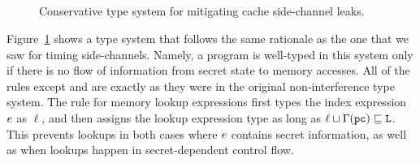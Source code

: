\documentclass[11pt,twoside]{scrartcl}
\begin{document}
\begin{figure}
\begin{calculus}
{\linferenceRule[sequent] {
  \lsequent{\Gamma}{\asprg}
  &\lsequent{\Gamma}{\bsprg}
}{
  \lsequent{\Gamma}{\asprg;\bsprg}
}}{}%
\end{calculus}
\\[1em]
\begin{calculus}
{}{}%
\end{calculus}
\\[1em]
\begin{calculus}
{}{}%
\end{calculus}
\\[1em]
\begin{calculus}
{}{}%
\end{calculus}
\\[1em]
\begin{calculus}
{}{}%
\end{calculus}

\caption{Conservative type system for mitigating cache side-channel leaks.}
\label{fig:cachetypes}
\end{figure}

Figure~\ref{fig:cachetypes} shows a type system that follows the same rationale as the one that we saw for timing side-channels. Namely, a program is well-typed in this system only if there is no flow of information from secret state to memory accesses. All of the rules except  and  are exactly as they were in the original non-interference type system. The rule  for memory lookup expressions first types the index expression $e$ as $\ell$, and then assigns the lookup expression type \lowsec as long as $\ell \sqcup \Gamma(\texttt{\upshape pc}) \sqsubseteq \texttt{\upshape L}$. This prevents lookups in both cases where $e$ contains secret information, as well as when lookups happen in secret-dependent control flow. 
\end{document}
